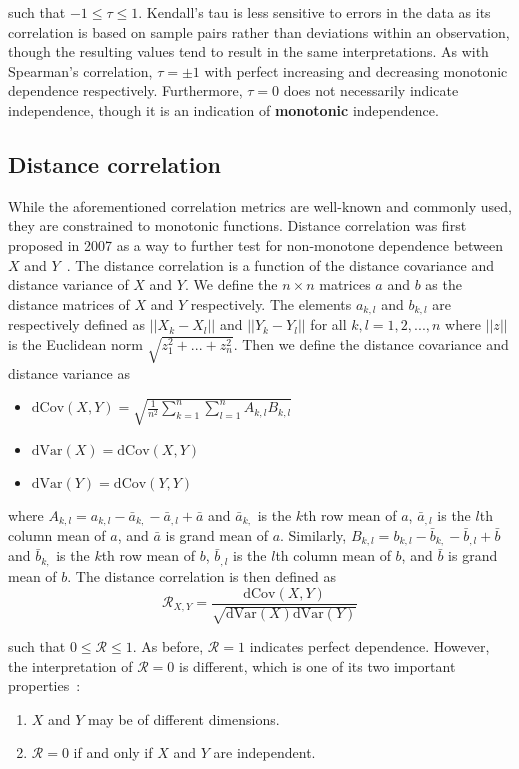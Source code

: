 \noindent such that $-1 \leq \tau \leq 1$. Kendall's tau is less sensitive to 
errors in 
the data as its correlation is
based on sample pairs rather than deviations within an observation, though the
resulting values tend to result in the same interpretations. As with Spearman's
correlation, $\tau=\pm1$ with perfect increasing and decreasing monotonic
dependence respectively. Furthermore, $\tau=0$ does not necessarily indicate
independence, though it is an indication of \textbf{monotonic} independence.

\subsection{Distance correlation}

While the aforementioned correlation metrics are well-known and commonly used, 
they are constrained to monotonic functions. Distance correlation was first 
proposed in 2007 as a way to further test for non-monotone dependence between 
$X$ and $Y$~\cite{szekely2007}. The distance correlation is a function of the 
distance covariance and distance variance of $X$ and $Y$. We define the 
$n\times n$ matrices $a$ and $b$ as the distance matrices of $X$ and $Y$ 
respectively. The elements $a_{k,l}$ and $b_{k,l}$ are respectively defined as 
$||X_k-X_l||$ and $||Y_k-Y_l||$ for all $k,l=1,2,...,n$ where $||z||$ is the 
Euclidean norm $\sqrt{z_1^2+...+z_n^2}$. Then we define the distance covariance 
and distance variance as 

\tablespacing
\begin{itemize}
	\item $\mathrm{dCov}(X,Y) = \sqrt{\frac{1}{n^2} \sum\limits_{k=1}^{n} 
	\sum\limits_{l=1}^{n} A_{k,l} B_{k,l}}$
	\item $\mathrm{dVar}(X) = \mathrm{dCov}(X,Y)$
	\item $\mathrm{dVar}(Y) = \mathrm{dCov}(Y,Y)$
\end{itemize}
\bodyspacing

\noindent where $A_{k,l}=a_{k,l}-\bar{a}_{k,}-\bar{a}_{,l}+\bar{a}$ and 
$\bar{a}_{k,}$ is the $k$th row mean of $a$, $\bar{a}_{,l}$ is the $l$th column 
mean of $a$, and $\bar{a}$ is grand mean of $a$. 
Similarly, $B_{k,l}=b_{k,l}-\bar{b}_{k,}-\bar{b}_{,l}+\bar{b}$ and 
$\bar{b}_{k,}$ is the $k$th row mean of $b$, $\bar{b}_{,l}$ is the $l$th column 
mean of $b$, and $\bar{b}$ is grand mean of $b$. The distance correlation is 
then defined as
$$\mathcal{R}_{X,Y}=\frac{\mathrm{dCov}(X,Y)}
{\sqrt{\mathrm{dVar}(X)\mathrm{dVar}(Y)}}$$

\noindent such that $0 \leq \mathcal{R} \leq 1$. As before, $\mathcal{R}=1$ 
indicates perfect dependence. However, the interpretation of $\mathcal{R}=0$ is 
different, which is one of its two important properties~\cite{szekely2007}: 

\tablespacing
\begin{enumerate}
	\item $X$ and $Y$ may be of different dimensions.
	\item $\mathcal{R}=0$ if and only if $X$ and $Y$ are independent.
\end{enumerate}
\bodyspacing

